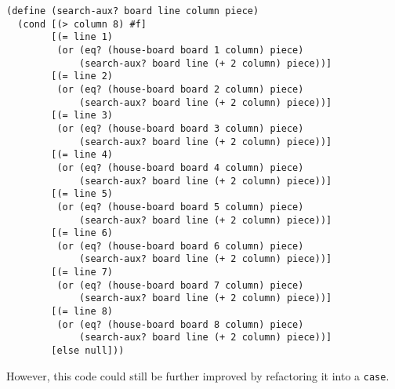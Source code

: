 \begin{lstlisting}
(define (search-aux? board line column piece)
  (cond [(> column 8) #f]
        [(= line 1)
         (or (eq? (house-board board 1 column) piece)
             (search-aux? board line (+ 2 column) piece))]
        [(= line 2)
         (or (eq? (house-board board 2 column) piece)
             (search-aux? board line (+ 2 column) piece))]
        [(= line 3)
         (or (eq? (house-board board 3 column) piece)
             (search-aux? board line (+ 2 column) piece))]
        [(= line 4)
         (or (eq? (house-board board 4 column) piece)
             (search-aux? board line (+ 2 column) piece))]
        [(= line 5)
         (or (eq? (house-board board 5 column) piece)
             (search-aux? board line (+ 2 column) piece))]
        [(= line 6)
         (or (eq? (house-board board 6 column) piece)
             (search-aux? board line (+ 2 column) piece))]
        [(= line 7)
         (or (eq? (house-board board 7 column) piece)
             (search-aux? board line (+ 2 column) piece))]
        [(= line 8)
         (or (eq? (house-board board 8 column) piece)
             (search-aux? board line (+ 2 column) piece))]
        [else null]))
\end{lstlisting}

However, this code could still be further improved by refactoring it into a {\tt case}. \\

